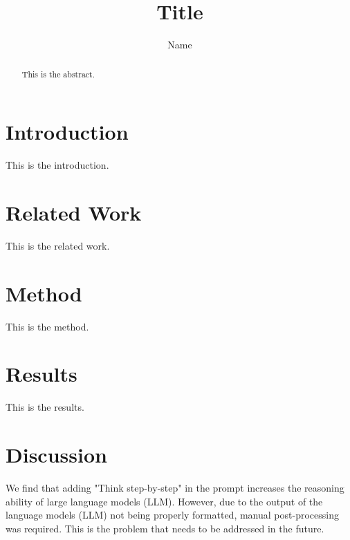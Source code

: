 \documentclass{article}
\title{Title}
\author{Name}
\begin{document}
\maketitle

\begin{abstract}
This is the abstract.
\end{abstract}

\section{Introduction}
This is the introduction.

\section{Related Work}
This is the related work.

\section{Method}
This is the method.

\section{Results}
This is the results.

\section{Discussion}
We find that adding "Think step-by-step" in the prompt increases the reasoning ability of large language models (LLM).
However, due to the output of the language models (LLM) not being properly formatted, manual post-processing was required. This is the problem that needs to be addressed in the future.
\end{document}
